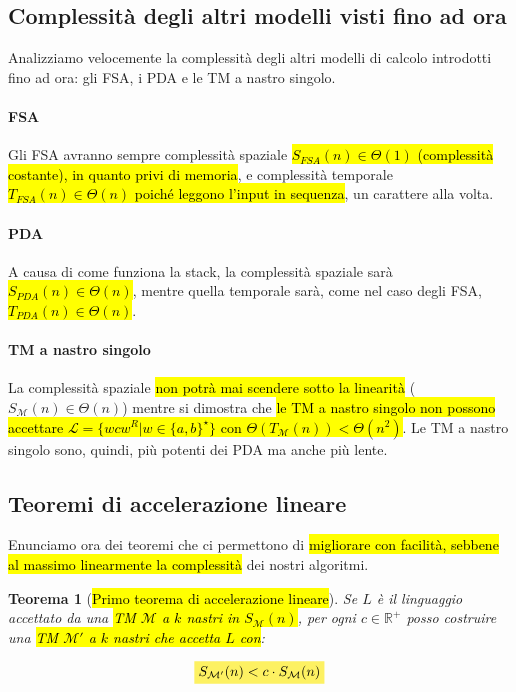 \documentclass[a4paper,11pt,twoside]{article}
\theoremstyle{plain}
\newtheorem{thm}{Teorema}[section]
\theoremstyle{definition}
\theoremstyle{remark}
\newcommand{\mhl}[1]{\colorbox{hlcolor}{$\displaystyle #1$}}
\begin{document}
\subsection{Complessità degli altri modelli visti fino ad ora}\label{sec:comp-fsa-pda-tm}

Analizziamo velocemente la complessità degli altri modelli di calcolo introdotti
fino ad ora: gli FSA, i PDA e le TM a nastro singolo.

\paragraph{FSA} Gli FSA avranno sempre complessità spaziale \hl{$S_{FSA}(n) \in
\Theta(1)$ (complessità costante), in quanto privi di memoria}, e complessità
temporale \hl{$T_{FSA}(n) \in \Theta(n)$ poiché leggono l'input in sequenza}, un
carattere alla volta.

\paragraph{PDA} A causa di come funziona la stack, la complessità spaziale sarà
\hl{$S_{PDA}(n) \in \Theta(n)$}, mentre quella temporale sarà, come nel caso
degli FSA, \hl{$T_{PDA}(n) \in \Theta(n)$}.

\paragraph{TM a nastro singolo} La complessità spaziale \hl{non potrà mai
scendere sotto la linearità} ($S_\mathcal{M}(n) \in \Theta(n)$) mentre si
dimostra che \hl{le TM a nastro singolo non possono accettare $\mathcal{L} = \{
wcw^R | w \in \{a,b\}^\star \}$ con $\Theta(T_\mathcal{M}(n)) < \Theta(n^2)$}.
Le TM a nastro singolo sono, quindi, più potenti dei PDA ma anche più lente.

\subsection{Teoremi di accelerazione lineare}\label{sec:acc-lin}

Enunciamo ora dei teoremi che ci permettono di \hl{migliorare con facilità,
sebbene al massimo linearmente la complessità} dei nostri algoritmi.

\begin{thm}[\hl{Primo teorema di accelerazione lineare}]\label{thm:acc-lin-1}
  Se $L$ è il linguaggio accettato da una \hl{TM $\mathcal{M}$ a $k$ nastri in
  $S_\mathcal{M}(n)$}, per ogni $c \in \mathbb{R}^+$ posso costruire una \hl{TM
  $\mathcal{M}'$ a $k$ nastri che accetta $L$ con}:

  \begin{equation}
    \mhl{ S_{\mathcal{M}'}(n) < c \cdot S_\mathcal{M}(n) }
  \end{equation}
\end{thm}
\end{document}
